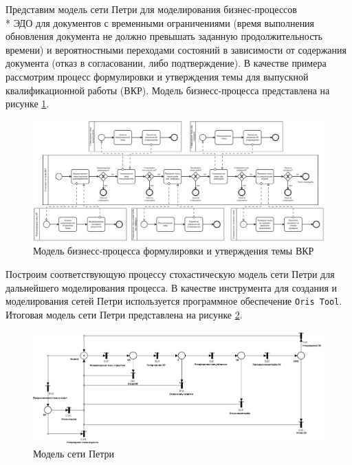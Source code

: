 Представим модель сети Петри для моделирования бизнес-процессов \\* ЭДО для документов с временными ограничениями (время выполнения обновления документа не должно превышать заданную продолжительность времени) и вероятностными переходами состояний в зависимости от содержания документа (отказ в согласовании, либо подтверждение). В качестве примера рассмотрим процесс формулировки и утверждения темы для выпускной квалификационной работы (ВКР). Модель бизнесс-процесса представлена на рисунке \ref{fig:vkr}.

\begin{figure}[h!btp]
	\centering
	\includegraphics[width=\textwidth]{inc/vkr_bpmn.pdf}
	\caption{Модель бизнесс-процесса формулировки и утверждения темы ВКР}
	\label{fig:vkr}	
\end{figure}

\clearpage

Построим соответствующую процессу стохастическую модель сети Петри для дальнейшего моделирования процесса. В качестве инструмента для создания и моделирования сетей Петри используется программное обеспечение \texttt{Oris Tool}\cite{oris}. Итоговая модель сети Петри представлена на рисунке \ref{fig:tpn}.

\begin{figure}[h!btp]
	\centering
	\includegraphics[width=\textwidth]{inc/timed.pdf}
	\caption{Модель сети Петри}
	\label{fig:tpn}	
\end{figure}

